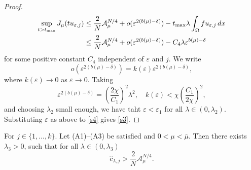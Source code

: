 \documentclass[reqno]{amsart}
\begin{document}
\begin{proof}
\begin{align*}
 \sup_{t> t_{\rm max}}J_{\mu}(tu_{\varepsilon, j})
 &\leq \frac{2}{N}\mathcal{A}_{\mu}^{N/4}+o(\varepsilon^{2(b(\mu)-\delta)})-t_{\rm max}\lambda \int_{\Omega}fu_{\varepsilon, j}\,dx\\
 &\leq \frac{2}{N}\mathcal{A}_{\mu}^{N/4}+o(\varepsilon^{2(b(\mu)-\delta)})-C_4\lambda \varepsilon^{b(\mu)-\delta}
\end{align*}
for some positive constant $C_4$ independent of $\varepsilon$ and $j$. We write
\[
 o(\varepsilon^{2(b(\mu)-\delta)})=k(\varepsilon )\varepsilon^{2(b(\mu)-\delta)},
\]
where \(k(\varepsilon )\to 0\) as \(\varepsilon \to 0\). Taking
\begin{equation}\label{s4}
 \varepsilon ^{2(b(\mu)-\delta)}=(\frac{2\chi}{C_1})^2\lambda^2, \quad
  k(\varepsilon)< \chi(\frac{C_1}{2\chi})^2,
\end{equation}
and choosing \(\lambda_2\) small enough, we have taht
 \(\varepsilon< \varepsilon_1\) 
for all \(\lambda\in (0,\lambda_2)\). 
Substituting \(\varepsilon\) as above to \eqref{s4} gives \eqref{s3}.
 \end{proof}

\begin{proposition}\label{p3}
For \(j\in \{1,\dots,k\}\). Let {\rm (A1)--(A3)} be satisfied and 
\(0<\mu<\bar{\mu}\). Then there exists \(\lambda_3>0\), such that for all
\(\lambda\in(0,\lambda_3)\)
\[
 \hat{c}_{\lambda, j}> \frac{2}{N}\mathcal{A}_{\mu}^{N/4}.
\]
\end{proposition}
 
\end{document}
